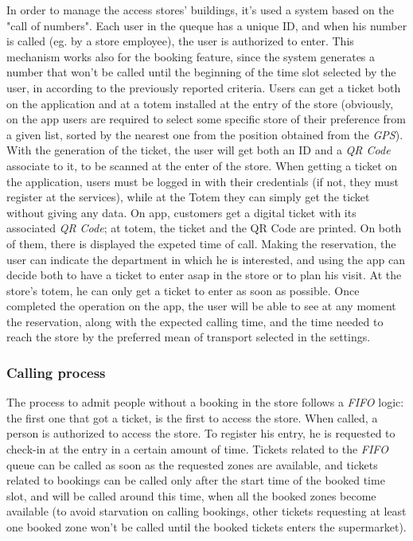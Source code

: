\documentclass{article}
\begin{document}
		In order to manage the access stores' buildings, it's used a system based on the "call of numbers". Each user in the queque has a unique ID, and when his number is called (eg. by a store employee), the user is authorized to enter. This mechanism works also for the booking feature, since the system generates a number that won't be called until the beginning of the time slot selected by the user, in according to the previously reported criteria. Users can get a ticket both on the application and at a totem installed at the entry of the store (obviously, on the app users are required to select some specific store of their preference from a given list, sorted by the nearest one from the position obtained from the \emph{GPS}). With the generation of the ticket, the user will get both an ID and a \emph{QR Code} associate to it, to be scanned at the enter of the store. When getting a ticket on the application, users must be logged in with their credentials (if not, they must register at the services), while at the Totem they can simply get the ticket without giving any data. On app, customers get a digital ticket with its associated \emph{QR Code}; at totem, the ticket and the QR Code are printed. On both of them, there is displayed the expeted time of call. Making the reservation, the user can indicate the department in which he is interested, and using the app can decide both to have a ticket to enter asap in the store or to plan his visit. At the store's totem, he can only get a ticket to enter as soon as possible. Once completed the operation on the app, the user will be able to see at any moment the reservation, along with the expected calling time, and the time needed to reach the store by the preferred mean of transport selected in the settings.
		
		\subsubsection{Calling process}
		
		The process to admit people without a booking in the store follows a \emph{FIFO} logic: the first one that got a ticket, is the first to access the store. When called, a person is authorized to access the store. To register his entry, he is requested to check-in at the entry in a certain amount of time. Tickets related to the \emph{FIFO} queue can be called as soon as the requested zones are available, and tickets related to bookings can be called only after the start time of the booked time slot, and will be called around this time, when all the booked zones become available (to avoid starvation on calling bookings, other tickets requesting at least one booked zone won't be called until the booked tickets enters the supermarket).
		
\end{document}
